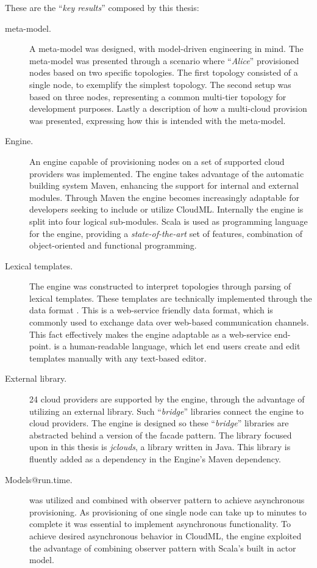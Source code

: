 These are the ``\emph{key results}'' composed by this thesis:
\begin{description}
  \item[meta-model.]
    A meta-model was designed, with model-driven engineering in mind.
    The meta-model was presented through a scenario where ``\emph{Alice}''
    provisioned nodes based on two specific topologies.
    The first topology consisted of a single node, to exemplify the simplest topology.
    The second setup was based on three nodes, representing a common multi-tier
    topology for development purposes.
    Lastly a description of how a multi-cloud provision was presented, 
    expressing how this is intended with the meta-model.
  \item[Engine.]
    An engine capable of provisioning nodes on a set of supported cloud providers
    was implemented.
    The engine takes advantage of the automatic building system Maven,
    enhancing the support for internal and external modules.
    Through Maven the engine becomes increasingly adaptable for developers
    seeking to include or utilize CloudML.
    Internally the engine is split into four logical sub-modules.
    Scala is used as programming language for the engine,
    providing a \emph{state-of-the-art} set of features,
    \eg combination of object-oriented and functional programming.
  \item[Lexical templates.]
    The engine was constructed to interpret topologies through parsing of lexical templates.
    These templates are technically implemented through the data format .
    This is a web-service friendly data format, which is commonly used to exchange data
    over web-based communication channels.
    This fact effectively makes the engine adaptable as a web-service end-point.
     is a human-readable language, which let end users create and edit
    templates manually with any text-based editor.
  \item[External library.]
    24 cloud providers are supported by the engine, through the advantage of 
    utilizing an external library.
    Such ``\emph{bridge}'' libraries connect the engine to cloud providers.
    The engine is designed so these ``\emph{bridge}'' libraries are abstracted
    behind a version of the facade pattern.
    The library focused upon in this thesis is \emph{jclouds},
    a library written in Java.
    This library is fluently added as a dependency in the Engine's Maven dependency.
  \item[Models@run.time.]
     was utilized and combined with observer pattern to
    achieve asynchronous provisioning.
    As provisioning of one single node can take up to minutes to complete it was
    essential to implement asynchronous functionality.
    To achieve desired asynchronous behavior in CloudML,
    the engine exploited the advantage of combining observer pattern with Scala's
    built in actor model.
\end{description}
